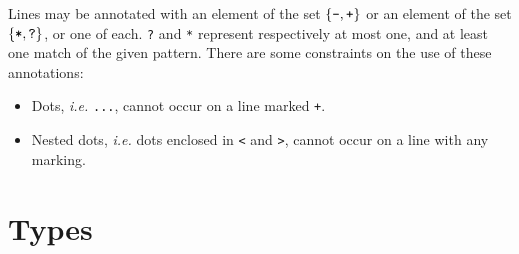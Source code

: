 \documentclass{article}
\newcommand{\mita}[1]{\mbox{\it{{#1}}}}
\newcommand{\mtt}[1]{\mbox{\tt{{#1}}}}
\newcommand{\msf}[1]{\mbox{\sf{{#1}}}}
\begin{document}


\noindent
Lines may be annotated with an element of the set $\{\mtt{-},
\mtt{+}\}$ or an element of the set $\{\mtt{*}, \mtt{?}\}$, or one of
each. \mtt{?} and \mtt{*} represent respectively at most one, and at
least one match of the given pattern.  There are some constraints on
the use of these annotations:
\begin{itemize}
\item Dots, {\em i.e.} \texttt{...}, cannot occur on a line marked
  \texttt{+}.
\item Nested dots, {\em i.e.} dots enclosed in {\tt <} and {\tt >}, cannot
  occur on a line with any marking.
\end{itemize}


\section{Types}
\label{types}
\end{document}
